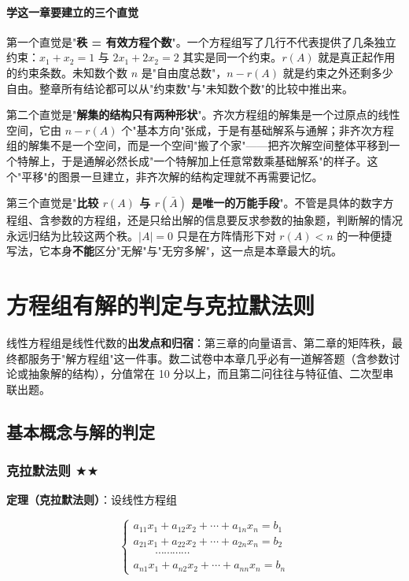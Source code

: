 \documentclass[11pt,openany,UTF8]{ctexbook}
\begin{document}
\paragraph{学这一章要建立的三个直觉}\mbox{}{\par}

第一个直觉是"\textbf{秩 = 有效方程个数}"。一个方程组写了几行不代表提供了几条独立约束：$x_1+x_2=1$ 与 $2x_1+2x_2=2$ 其实是同一个约束。$r(A)$ 就是真正起作用的约束条数。未知数个数 $n$ 是"自由度总数"，$n-r(A)$ 就是约束之外还剩多少自由。整章所有结论都可以从"约束数"与"未知数个数"的比较中推出来。

第二个直觉是"\textbf{解集的结构只有两种形状}"。齐次方程组的解集是一个过原点的线性空间，它由 $n-r(A)$ 个"基本方向"张成，于是有基础解系与通解；非齐次方程组的解集不是一个空间，而是一个空间"搬了个家"——把齐次解空间整体平移到一个特解上，于是通解必然长成"一个特解加上任意常数乘基础解系"的样子。这个"平移"的图景一旦建立，非齐次解的结构定理就不再需要记忆。

第三个直觉是"\textbf{比较 $r(A)$ 与 $r(\bar A)$ 是唯一的万能手段}"。不管是具体的数字方程组、含参数的方程组，还是只给出解的信息要反求参数的抽象题，判断解的情况永远归结为比较这两个秩。$\vert A\vert=0$ 只是在方阵情形下对 $r(A)<n$ 的一种便捷写法，它本身\textbf{不能}区分"无解"与"无穷多解"，这一点是本章最大的坑。

\section{方程组有解的判定与克拉默法则}

线性方程组是线性代数的\textbf{出发点和归宿}：第三章的向量语言、第二章的矩阵秩，最终都服务于"解方程组"这一件事。数二试卷中本章几乎必有一道解答题（含参数讨论或抽象解的结构），分值常在 10 分以上，而且第二问往往与特征值、二次型串联出题。

\subsection{基本概念与解的判定}

\subsubsection{克拉默法则 $\bigstar$$\bigstar$}

\textbf{定理（克拉默法则）}：设线性方程组

\[\begin{cases}
a_{11}x_1+a_{12}x_2+\cdots+a_{1n}x_n=b_1 \\
a_{21}x_1+a_{22}x_2+\cdots+a_{2n}x_n=b_2 \\
\qquad\cdots\cdots\cdots\cdots \\
a_{n1}x_1+a_{n2}x_2+\cdots+a_{nn}x_n=b_n
\end{cases}\]
\end{document}
